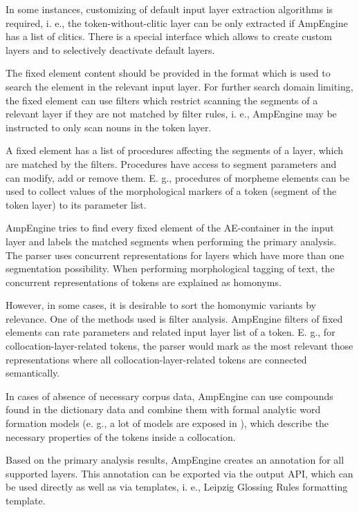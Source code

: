 \documentclass[b5paper,notitlepage]{article}
\begin{document}
In some instances, customizing of default input layer extraction algorithms is required, i. e., the token-without-clitic layer can be only extracted if AmpEngine has a list of clitics. There is a special interface which allows to create custom layers and to selectively deactivate default layers.

The fixed element content should be provided in the format which is used to search the element in the relevant input layer. For further search domain limiting, the fixed element can use filters which restrict scanning the segments of a relevant layer if they are not matched by filter rules, i. e., AmpEngine may be instructed to only scan nouns in the token layer.

A fixed element has a list of procedures affecting the segments of a layer, which are matched by the filters. Procedures have access to segment parameters and can modify, add or remove them. E. g., procedures of morpheme elements can be used to collect values of the morphological markers of a token (segment of the token layer) to its parameter list.

AmpEngine tries to find every fixed element of the AE-container in the input layer and labels the matched segments when performing the primary analysis. The parser uses concurrent representations for layers which have more than one segmentation possibility. When performing morphological tagging of text, the concurrent representations of tokens are explained as homonyms.

However, in some cases, it is desirable to sort the homonymic variants by relevance. One of the methods used is filter analysis. AmpEngine filters of fixed elements can rate parameters and related input layer list of a token. E. g., for collocation-layer-related tokens, the parser would mark as the most relevant those representations where all collocation-layer-related tokens are connected semantically.

In cases of absence of necessary corpus data, AmpEngine can use compounds found in the dictionary data and combine them with formal analytic word formation models (e. g., a lot of models are exposed in \cite{Rombandeeva vogul}), which describe the necessary properties of the tokens inside a collocation.

Based on the primary analysis results, AmpEngine creates an annotation for all supported layers. This annotation can be exported via the output API, which can be used directly as well as via templates, i. e., Leipzig Glossing Rules formatting template.
\end{document}
